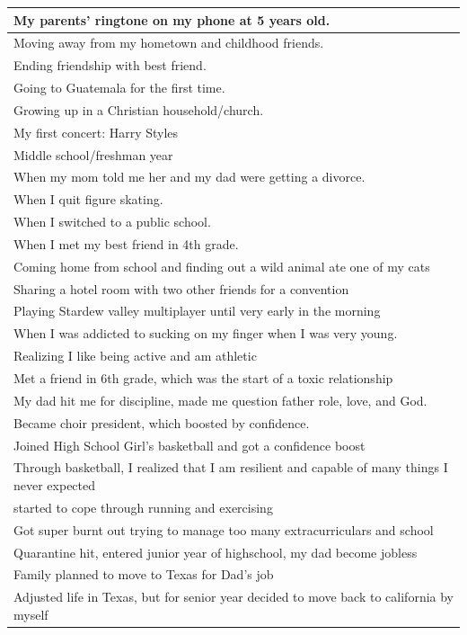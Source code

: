 \documentclass[
  .7em,
  letterpaper,
  DIV=11,
  numbers=noendperiod]{scrartcl}
\begin{document}
\begin{table}
\begin{tabular}{l}
\hline
My parents' ringtone on my phone at 5 years old.\\
\hline
Moving away from my hometown and childhood friends.\\
\hline
Ending friendship with best friend.\\
\hline
Going to Guatemala for the first time.\\
\hline
Growing up in a Christian household/church.\\
\hline
My first concert: Harry Styles\\
\hline
Middle school/freshman year\\
\hline
When my mom told me her and my dad were getting a divorce.\\
\hline
When I quit figure skating.\\
\hline
When I switched to a public school.\\
\hline
When I met my best friend in 4th grade.\\
\hline
Coming home from school and finding out a wild animal ate one of my cats\\
\hline
Sharing a hotel room with two other friends for a convention\\
\hline
Playing Stardew valley multiplayer until very early in the morning\\
\hline
When I was addicted to sucking on my finger when I was very young.\\
\hline
Realizing I like being active and am athletic\\
\hline
Met a friend in 6th grade, which was the start of a toxic relationship\\
\hline
My dad hit me for discipline, made me question father role, love, and God.\\
\hline
Became choir president, which boosted by confidence.\\
\hline
Joined High School Girl's basketball and got a confidence boost\\
\hline
Through basketball, I realized that I am resilient and capable of many things I never expected\\
\hline
started to cope through running and exercising\\
\hline
Got super burnt out trying to manage too many extracurriculars and school\\
\hline
Quarantine hit, entered junior year of highschool,  my dad become jobless\\
\hline
Family planned to move to Texas for Dad's job\\
\hline
Adjusted life in Texas, but for senior year decided to move back to california by myself\\

\end{tabular}
\end{table}
\end{document}
